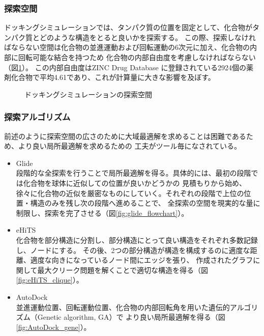 \subsubsection{探索空間}
ドッキングシミュレーションでは、タンパク質の位置を固定として、化合物がタンパク質とどのような構造をとると良いかを探索する。
この際、探索しなければならない空間は化合物の並進運動および回転運動の6次元に加え、化合物の内部に回転可能な結合を持つため
化合物の内部自由度を考慮しなければならない（図\ref{fig:docking_freedom}）。
この内部自由度はZINC Drug Database に登録されている2924個の薬剤化合物で平均4.61であり、これが計算量に大きな影響を及ぼす。

\begin{figure}[tb]
 \begin{center}
  \caption{ドッキングシミュレーションの探索空間}
  \label{fig:docking_freedom}
 \end{center}
\end{figure}


\subsubsection{探索アルゴリズム}
前述のように探索空間の広さのために大域最適解を求めることは困難であるため、より良い局所最適解を求めるための
工夫がツール毎になされている。
\begin{itemize}
\item Glide\cite{Friesner2004}\\
	段階的な全探索を行うことで局所最適解を得る。具体的には、最初の段階では化合物を球体に近似しての位置が良いかどうかの
	見積もりから始め、徐々に化合物の近似を厳密なものにしていく。それぞれの段階で上位の位置・構造のみを残し次の段階へ進めることで、
	全探索の空間を現実的な量に制限し、探索を完了させる（図\ref{fig:glide_flowchart}）。
\item eHiTS\cite{Zsoldos2007}\\
	化合物を部分構造に分割し、部分構造にとって良い構造をそれぞれ多数記録し、ノードにする。
	その後、2つの部分構造が構造を構成するのに適度な距離、適度な向きになっているノード間にエッジを張り、
	作成されたグラフに関して最大クリーク問題を解くことで適切な構造を得る（図\ref{fig:eHiTS_clique}）。
\item AutoDock\cite{Morris2009}\\
	並進運動位置、回転運動位置、化合物の内部回転角を用いた遺伝的アルゴリズム（Genetic algorithm, GA）で
	より良い局所最適解を得る（図\ref{fig:AutoDock_gene}）。
\end{itemize}

